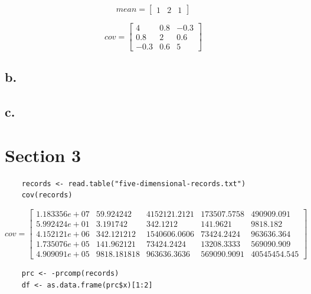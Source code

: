 \documentclass{report}
\begin{document}
\[
  mean=
  \begin{bmatrix}
    1 & 2 & 1
  \end{bmatrix}
\]

\[
  cov=
  \begin{bmatrix}
    4 & 0.8 & -0.3 \\
    0.8 & 2 & 0.6 \\
    -0.3 & 0.6 & 5
  \end{bmatrix}
\]

\section{b.}

\section{c.}

\chapter{Section 3}

\begin{verbatim}
	records <- read.table("five-dimensional-records.txt")
	cov(records)
\end{verbatim}

\[
  cov=
  \begin{bmatrix}
	1.183356e+07 & 59.924242 & 4152121.2121 & 173507.5758 & 490909.091 \\
	5.992424e+01 & 3.191742 & 342.1212 & 141.9621 & 9818.182 \\
	4.152121e+06 & 342.121212 & 1540606.0606 & 73424.2424 & 963636.364 \\
	1.735076e+05 & 141.962121 & 73424.2424 & 13208.3333 & 569090.909 \\
	4.909091e+05 & 9818.181818 & 963636.3636 & 569090.9091 & 40545454.545
  \end{bmatrix}
\]

\begin{verbatim}	
	prc <- -prcomp(records)
	df <- as.data.frame(prc$x)[1:2]
	
\end{verbatim}
\end{document}
